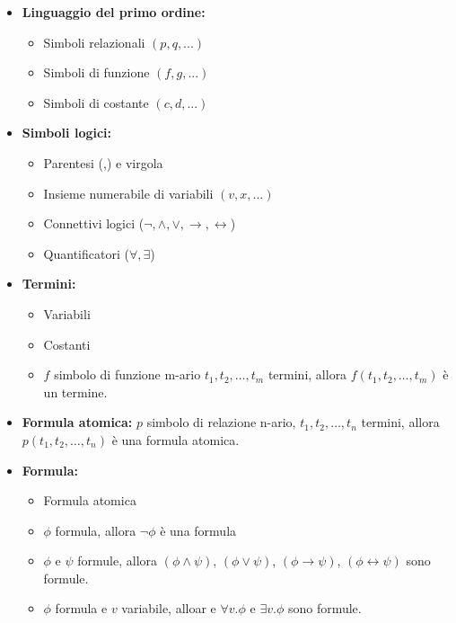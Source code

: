 \documentclass[a4paper]{article}
\begin{document}
\begin{itemize}
    \item \textbf{Linguaggio del primo ordine:} 
    \begin{itemize}
        \item Simboli relazionali $(p,q, ...)$
        \item Simboli di funzione $(f,g, ...)$
        \item Simboli di costante $(c,d, ...)$
    \end{itemize}
    \item \textbf{Simboli logici:}
    \begin{itemize}
        \item Parentesi (,) e virgola
        \item Insieme numerabile di variabili $(v,x,...)$
        \item Connettivi logici ($\neg, \land, \lor, \rightarrow, \leftrightarrow$)
        \item Quantificatori ($\forall, \exists$)
    \end{itemize}
    \item \textbf{Termini:}
        \begin{itemize}
            \item Variabili
            \item Costanti
            \item $f$ simbolo di funzione m-ario $t_1, t_2, \dots, t_m$ termini, allora $f(t_1, t_2, \dots, t_m)$ è un termine.
        \end{itemize}
    \item \textbf{Formula atomica:} $p$ simbolo di relazione n-ario, 
    $t_1,t_2,\dots,t_n$ 
    termini, allora $p(t_1,t_2,\dots,t_n)$ è una formula atomica.
    \item \textbf{Formula:}
    \begin{itemize}
        \item Formula atomica
        \item $\phi$ formula, allora $\neg \phi$ è una formula
        \item $\phi$ e $\psi$ formule, allora $(\phi \land \psi)$, $(\phi \lor \psi)$, $(\phi \rightarrow \psi)$, $(\phi \leftrightarrow \psi)$ sono formule.
        \item $\phi$ formula e $v$ variabile, alloar e $\forall v . \phi$ e $\exists v . \phi$ sono formule.
    \end{itemize}
\end{itemize}
\end{document}
